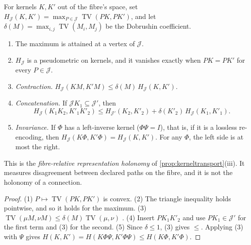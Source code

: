 \documentclass[11pt]{article}
\theoremstyle{definition}\newtheorem{definition}[theorem]{Definition}\newtheorem{remark}[theorem]{Remark}\newtheorem{example}[theorem]{Example}\newtheorem{problem}[theorem]{Open problem}\crefname{problem}{Problem}{Problems}
\begin{document}
\begin{lemma}\label{lem:pathdisc}
For kernels $K,K'$ out of the fibre's space, set $H_{\mathcal J}(K,K')=\max_{P\in\mathcal J}\operatorname{TV}(PK,PK')$, and let $\delta(M)=\max_{i,j}\operatorname{TV}(M_i,M_j)$ be the Dobrushin coefficient.
\begin{enumerate}
\item[(1)] The maximum is attained at a vertex of $\mathcal J$.
\item[(2)] $H_{\mathcal J}$ is a pseudometric on kernels, and it vanishes exactly when $PK=PK'$ for every $P\in\mathcal J$.
\item[(3)] \emph{Contraction.} $H_{\mathcal J}(KM,K'M)\le\delta(M)\,H_{\mathcal J}(K,K')$.
\item[(4)] \emph{Concatenation.} If $\mathcal JK_1\subseteq\mathcal J'$, then
\[
H_{\mathcal J}(K_1K_2,K'_1K'_2)\le H_{\mathcal J'}(K_2,K'_2)+\delta(K'_2)\,H_{\mathcal J}(K_1,K'_1).
\]
\item[(5)] \emph{Invariance.} If $\Phi$ has a left-inverse kernel ($\Phi\Psi=I$), that is, if it is a lossless re-encoding, then $H_{\mathcal J}(K\Phi,K'\Phi)=H_{\mathcal J}(K,K')$. For any $\Phi$, the left side is at most the right.
\end{enumerate}
This is the \emph{fibre-relative representation holonomy} of \cref{prop:kerneltransport}(iii). It measures disagreement between declared paths on the fibre, and it is not the holonomy of a connection.
\end{lemma}

\begin{proof}
(1) $P\mapsto\operatorname{TV}(PK,PK')$ is convex. (2) The triangle inequality holds pointwise, and so it holds for the maximum. (3) $\operatorname{TV}(\mu M,\nu M)\le\delta(M)\operatorname{TV}(\mu,\nu)$ \cite{Dobrushin1956}. (4) Insert $PK_1K'_2$ and use $PK_1\in\mathcal J'$ for the first term and (3) for the second. (5) Since $\delta\le1$, (3) gives $\le$. Applying (3) with $\Psi$ gives $H(K,K')=H(K\Phi\Psi,K'\Phi\Psi)\le H(K\Phi,K'\Phi)$.
\end{proof}
\end{document}
